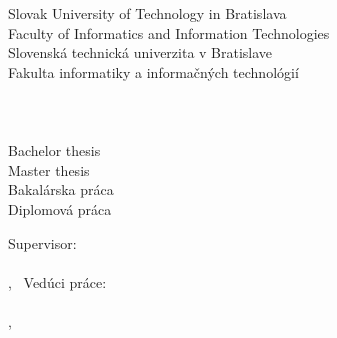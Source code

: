 \begin{center}
\thispagestyle{empty}
{
	{\Large Slovak University of Technology in Bratislava}\textbf{}\\
	{\Large Faculty of Informatics and Information Technologies}\textbf{}\\[\baselineskip]
}
{
	{\Large Slovenská technická univerzita v Bratislave}\textbf{}\\
	{\Large Fakulta informatiky a informačných technológií}\textbf{}\\[\baselineskip]
}
{\large \FIIT}\\
\vspace*{4cm}
{\Large \Author}\textbf{}\\[\baselineskip]
{\huge \Title}\textbf{}\\[\baselineskip]
{
	{
		{\large Bachelor thesis}\\
	}
	{
		{\large Master thesis}\\
	}
}
{
	{
		{\large Bakalárska práca}\\
	}
	{
		{\large Diplomová práca}\\
	}
}

\end{center}
{
	Supervisor: \Supervisor \\\\
	\Year,\ \MonthENG 
}
{
	Vedúci práce: \Supervisor \\\\
    \MonthSVK,\ \Year
}

